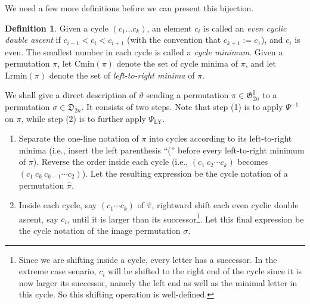 \documentclass[11pt,reqno]{amsart}
\numberwithin{equation}{section}
\theoremstyle{plain}
\theoremstyle{definition}
\newtheorem{Def}[theorem]{Definition}
\newcommand{\fD}{\mathfrak{D}}
\newcommand{\fG}{\mathfrak{G}}
\newcommand{\GI}{\fG^{\mathrm{I}}}
\def\PLY{\Psi_{\mathrm{LY}}}
\def\Lrmin{\mathrm{Lrmin}}
\def\Cmin{\mathrm{Cmin}}
\begin{document}
We need a few more definitions before we can present this bijection.

\begin{Def}\label{even cyclic double ascent def}
Given a cycle $(c_1 \ldots c_k)$, an element $c_i$ is called an \emph{ even cyclic double ascent} if $c_{i-1}<c_i<c_{i+1}$ (with the convention that $c_{k+1}:=c_1$), and $c_i$ is even. The smallest number in each cycle is called a \emph{cycle minimum}. Given a permutation $\pi$, let $\Cmin(\pi)$ denote the set of cycle minima of $\pi$, and let $\Lrmin(\pi)$ denote the set of \emph{left-to-right minima} of $\pi$.
\end{Def}

We shall give a direct description of $\vartheta$ sending a permutation $\pi\in\GI_{2n}$ to a permutation $\sigma\in\fD_{2n}$. It consists of two steps. Note that step (1) is to apply $\Psi^{-1}$ on $\pi$, while step (2) is to further apply $\PLY$.
\begin{enumerate}
	\item Separate the one-line notation of $\pi$ into cycles according to its left-to-right minima (i.e., insert the left parenthesis ``('' before every left-to-right minimum of $\pi$). Reverse the order inside each cycle (i.e., $(c_1~c_2\cdots c_k)$ becomes $(c_1~c_k~c_{k-1}\cdots c_2)$). Let the resulting expression be the cycle notation of a permutation $\hat{\pi}$.
	\item Inside each cycle, say $(c_1 \cdots c_k)$ of $\hat{\pi}$, rightward shift each even cyclic double ascent, say $c_i$, until it is larger than its successor\footnote{Since we are shifting inside a cycle, every letter has a successor. In the extreme case senario, $c_i$ will be shifted to the right end of the cycle since it is now larger its successor, namely the left end as well as the minimal letter in this cycle. So this shifting operation is well-defined.}. Let this final expression be the cycle notation of the image permutation $\sigma$.
\end{enumerate}
\end{document}
